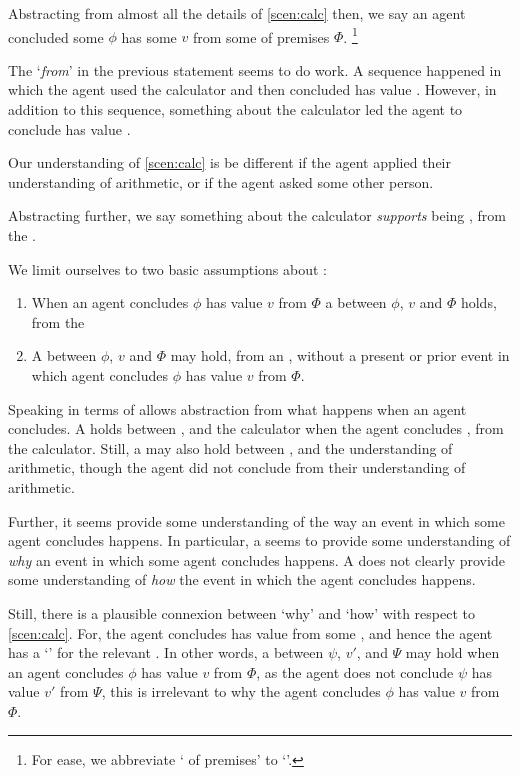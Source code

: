 \begin{note}
  Abstracting from almost all the details of \autoref{scen:calc} then, we say an agent concluded some \prop{} \(\phi\) has some \val{} \(v\) from some \pool{} of premises \(\Phi\).%
  \footnote{
    For ease, we abbreviate `\pool{} of premises' to `\pool{}'.
  }

  The `\emph{from}' in the previous statement seems to do work.
  A sequence happened in which the agent used the calculator and then concluded \propM{\gistCalcEq{}} has value .
  However, in addition to this sequence, something about the calculator led the agent to conclude \propM{\gistCalcEq{}} has value .

  Our understanding of \autoref{scen:calc} is be different if the agent applied their understanding of arithmetic, or if the agent asked some other person.
\end{note}

\begin{note}
  Abstracting further, we say something about the calculator \emph{supports} \propM{\gistCalcEq{}} being , from the \agpe{}.

  We limit ourselves to two basic assumptions about :
  \begin{enumerate}
  \item
    When an agent concludes \(\phi\) has value \(v\) from \(\Phi\) a \ros{} between \(\phi\), \(v\) and \(\Phi\) holds, from the \agpe{}
  \item
    A \ros{} between \(\phi\), \(v\) and \(\Phi\) may hold, from an \agpe{}, without a present or prior event in which agent concludes \(\phi\) has value \(v\) from \(\Phi\).
  \end{enumerate}
  Speaking in terms of  allows abstraction from what happens when an agent concludes.
  A \ros{} holds between \propM{\gistCalcEq{}},  and the calculator when the agent concludes \propM{\gistCalcEq{}},  from the calculator.
  Still, a \ros{} may also hold between \propM{\gistCalcEq{}},  and the \agents{} understanding of arithmetic, though the agent did not conclude from their understanding of arithmetic.

  Further, it seems  provide some understanding of the way an event in which some agent concludes happens.
  In particular, a \ros{} seems to provide some understanding of \emph{why} an event in which some agent concludes happens.
  A \ros{} does not clearly provide some understanding of \emph{how} the event in which the agent concludes happens.

  Still, there is a plausible connexion between `why' and `how' with respect to \autoref{scen:calc}.
  For, the agent concludes \propM{\gistCalcEq{}} has value  from some \pool{}, and hence the agent has a `\wit{}' for the relevant \ros{}.
  In other words, a \ros{} between \(\psi\), \(v'\), and \(\Psi\) may hold when an agent concludes \(\phi\) has value \(v\) from \(\Phi\), as the agent does not conclude \(\psi\) has value \(v'\) from \(\Psi\), this \ros{} is irrelevant to why the agent concludes \(\phi\) has value \(v\) from \(\Phi\).
\end{note}

